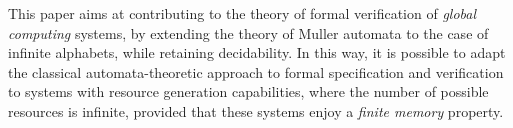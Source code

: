 


This paper aims at contributing to the theory of formal verification of \emph{global computing} systems, by extending the theory of Muller automata to the case of infinite alphabets, while retaining decidability. In this way, it is possible to adapt the classical automata-theoretic approach to formal specification and verification \cite{ClarkeS01} to systems with resource generation capabilities, where the number of possible resources is infinite, provided that these systems enjoy a \emph{finite memory} property. 

